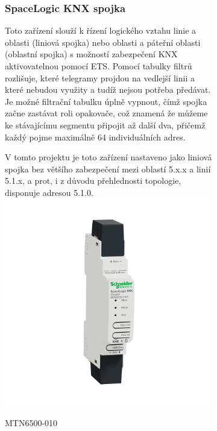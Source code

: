 \documentclass[12pt, a4paper,
twoside,        %
openright
]{report}
\begin{document}
\begin{figure}[h]
\centering
\begin{subfigure}{0.9\textwidth}
	\subsubsection{SpaceLogic KNX spojka}
	Toto zařízení slouží k řízení logického vztahu linie a oblasti (liniová spojka) nebo oblasti a páteřní oblasti (oblastní spojka) s možností zabezpečení KNX aktivovatelnou pomocí ETS. Pomocí tabulky filtrů rozlišuje, které telegramy projdou na vedlejší linii a které nebudou využity a tudíž nejsou potřeba předávat. Je možné filtrační tabulku úplně vypnout, čímž spojka začne zastávat roli opakovače, což znamená že můžeme ke stávajícímu segmentu připojit až další dva, přičemž každý pojme maximálně 64 individuálních adres.

	\noindent V tomto projektu je toto zařízení nastaveno jako liniová spojka bez většího zabezpečení mezi oblastí 5.x.x a linií 5.1.x, a prot, i z důvodu přehlednosti topologie, disponuje adresou 5.1.0.
		\centering
		\includegraphics[scale=0.09]{image/MTN6500-0101.jpg}
		\caption{MTN6500-010 }
		\label{image:8}
\end{subfigure}

\begin{subfigure}{0.9\textwidth}

\end{subfigure}
\end{figure}
\end{document}
